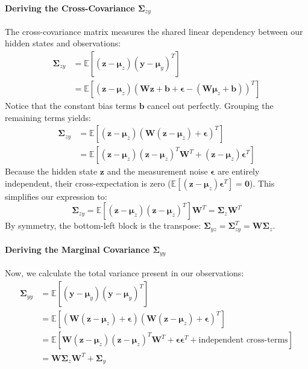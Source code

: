 \documentclass{article}
\begin{document}
\paragraph{Deriving the Cross-Covariance $\boldsymbol{\Sigma}_{zy}$}
The cross-covariance matrix measures the shared linear dependency between our hidden states and observations:
\begin{align*}
\boldsymbol{\Sigma}_{zy} &= \mathbb{E}\left[ (\mathbf{z} - \boldsymbol{\mu}_z)(\mathbf{y} - \boldsymbol{\mu}_y)^T \right] \\
&= \mathbb{E}\left[ (\mathbf{z} - \boldsymbol{\mu}_z)(\mathbf{W}\mathbf{z} + \mathbf{b} + \boldsymbol{\epsilon} - (\mathbf{W}\boldsymbol{\mu}_z + \mathbf{b}))^T \right]
\end{align*}
Notice that the constant bias terms $\mathbf{b}$ cancel out perfectly. Grouping the remaining terms yields:
\begin{align*}
\boldsymbol{\Sigma}_{zy} &= \mathbb{E}\left[ (\mathbf{z} - \boldsymbol{\mu}_z)(\mathbf{W}(\mathbf{z} - \boldsymbol{\mu}_z) + \boldsymbol{\epsilon})^T \right] \\
&= \mathbb{E}\left[ (\mathbf{z} - \boldsymbol{\mu}_z)(\mathbf{z} - \boldsymbol{\mu}_z)^T \mathbf{W}^T + (\mathbf{z} - \boldsymbol{\mu}_z)\boldsymbol{\epsilon}^T \right]
\end{align*}
Because the hidden state $\mathbf{z}$ and the measurement noise $\boldsymbol{\epsilon}$ are entirely independent, their cross-expectation is zero ($\mathbb{E}[(\mathbf{z} - \boldsymbol{\mu}_z)\boldsymbol{\epsilon}^T] = \mathbf{0}$). This simplifies our expression to:
\begin{equation}
\boldsymbol{\Sigma}_{zy} = \mathbb{E}\left[ (\mathbf{z} - \boldsymbol{\mu}_z)(\mathbf{z} - \boldsymbol{\mu}_z)^T \right] \mathbf{W}^T = \boldsymbol{\Sigma}_z \mathbf{W}^T \tag{29}
\end{equation}
By symmetry, the bottom-left block is the transpose: $\boldsymbol{\Sigma}_{yz} = \boldsymbol{\Sigma}_{zy}^T = \mathbf{W}\boldsymbol{\Sigma}_z$.

\paragraph{Deriving the Marginal Covariance $\boldsymbol{\Sigma}_{yy}$}
Now, we calculate the total variance present in our observations:
\begin{align*}
\boldsymbol{\Sigma}_{yy} &= \mathbb{E}\left[ (\mathbf{y} - \boldsymbol{\mu}_y)(\mathbf{y} - \boldsymbol{\mu}_y)^T \right] \\
&= \mathbb{E}\left[ (\mathbf{W}(\mathbf{z} - \boldsymbol{\mu}_z) + \boldsymbol{\epsilon})(\mathbf{W}(\mathbf{z} - \boldsymbol{\mu}_z) + \boldsymbol{\epsilon})^T \right] \\
&= \mathbb{E}\left[ \mathbf{W}(\mathbf{z} - \boldsymbol{\mu}_z)(\mathbf{z} - \boldsymbol{\mu}_z)^T\mathbf{W}^T + \boldsymbol{\epsilon}\boldsymbol{\epsilon}^T + \text{independent cross-terms} \right] \\
&= \mathbf{W}\boldsymbol{\Sigma}_z\mathbf{W}^T + \boldsymbol{\Sigma}_y \tag{30}
\end{align*}
\end{document}
